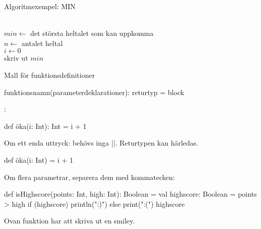 \begin{Slide}{Algoritmexempel: MIN}
\begin{algorithm}[H]

 ~\\
 $min \leftarrow$ det största heltalet som kan uppkomma  \\
 $n \leftarrow $ antalet heltal \\
 $i \leftarrow 0$ \\
 skriv ut $min$
\end{algorithm}
\end{Slide}



\begin{Slide}{Mall för funktionsdefinitioner}

 funktionsnamn(parameterdeklarationer): returtyp = block

\pause\vspace{0.5em}:

\begin{Code}[basicstyle=\ttfamily\fontsize{9}{11}\selectfont]
def öka(i: Int): Int = { i + 1 }
\end{Code}
\pause Om ett enda uttryck: behövs inga \code|{}|. Returtypen kan härledas.
\begin{Code}[basicstyle=\ttfamily\fontsize{9}{11}\selectfont]
def öka(i: Int) = i + 1  
\end{Code}
\pause Om flera parametrar, separera dem med kommatecken: 
\begin{Code}[basicstyle=\ttfamily\fontsize{9}{11}\selectfont]
def isHighscore(points: Int, high: Int): Boolean = {
  val highscore: Boolean = points > high
  if (highscore) println(":)") else print(":(")
  highscore
}
\end{Code}
\pause Ovan funktion har  att skriva ut en smiley.
\end{Slide}


